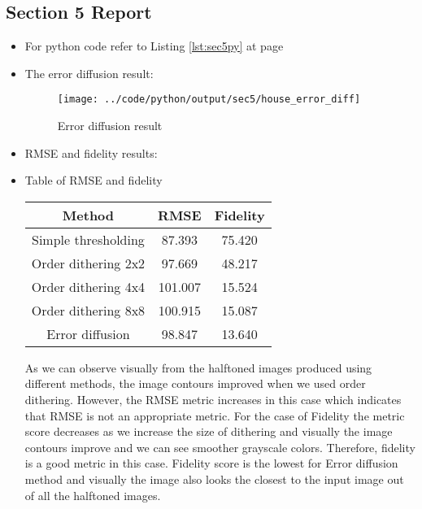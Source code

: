 \documentclass[a4paper,11pt]{article}
\newcommand{\reflst}[1]{Listing \ref{#1} at page \pageref{#1}}
\begin{document}
\subsection*{Section 5 Report} 
\begin{itemize}
 \item For python code refer to \reflst{lst:sec5py}
 \item The error diffusion result:
 \begin{figure}[!hp]
  \centering
  \texttt{[image: ../code/python/output/sec5/house\_error\_diff]}
  \caption{Error diffusion result}
 \end{figure}
 \item RMSE and fidelity results:
  
\item Table of RMSE and fidelity
\begin{table}[!h]
    \centering
    \begin{tabular}{|c|c|c|}
    \hline
    Method& RMSE& Fidelity\\
    \hline
    Simple thresholding& 87.393& 75.420\\
    \hline
    Order dithering 2x2& 97.669& 48.217\\
    \hline
    Order dithering 4x4& 101.007& 15.524\\
    \hline
    Order dithering 8x8& 100.915& 15.087\\
    \hline
    Error diffusion& 98.847& 13.640\\
    \hline
    \end{tabular}
\end{table}

As we can observe visually from the halftoned images produced using different methods, the image contours improved when we used order dithering. However, the RMSE metric increases in this case which indicates that RMSE is not an appropriate metric. For the case of Fidelity the metric score decreases as we increase the size of dithering and visually the image contours improve and we can see smoother grayscale colors. Therefore, fidelity is a good metric in this case. Fidelity score is the lowest for Error diffusion method and visually the image also looks the closest to the input image out of all the halftoned images.

\end{itemize}


\clearpage
\end{document}
